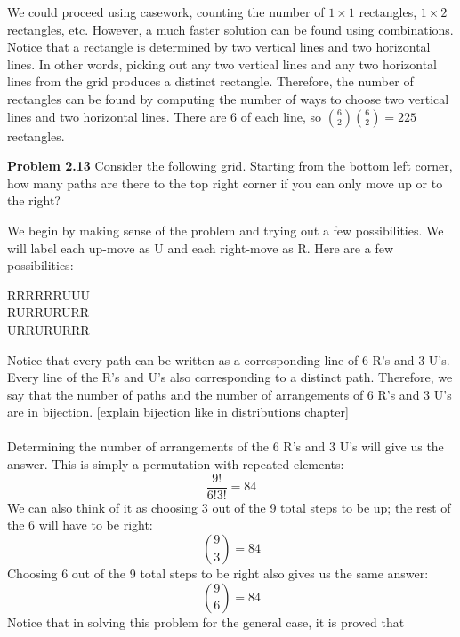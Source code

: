 \documentclass[11pt]{scrartcl}
\begin{document}
\noindent 
We could proceed using casework, counting the number of $1 \times 1$ rectangles, $1 \times 2$ rectangles, etc. However, a much faster solution can be found using combinations. Notice that a rectangle is determined by two vertical lines and two horizontal lines. In other words, picking out any two vertical lines and any two horizontal lines from the grid produces a distinct rectangle. Therefore, the number of rectangles can be found by computing the number of ways to choose two vertical lines and two horizontal lines. There are 6 of each line, so ${{6 \choose 2}}{{6 \choose 2}}=225$ rectangles. 
\begin{tcolorbox}
\textbf{Problem 2.13} Consider the following grid. Starting from the bottom left corner, how many paths are there to the top right corner if you can only move up or to the right?
\vspace*{+0.25cm}

\centering 
{}
\end{tcolorbox}
\noindent 
We begin by making sense of the problem and trying out a few possibilities. We will label each up-move as U and each right-move as R. Here are a few possibilities: 
\begin{center}
    RRRRRRUUU\\
    RURRURURR\\
    URRURURRR
\end{center}
Notice that every path can be written as a corresponding line of 6 R's and 3 U's. Every line of the R's and U's also corresponding to a distinct path. Therefore, we say that the number of paths and the number of arrangements of 6 R's and 3 U's are in bijection. [explain bijection like in distributions chapter]\\
\\
\noindent 
Determining the number of arrangements of the 6 R's and 3 U's will give us the answer. This is simply a permutation with repeated elements: 
$$\frac{9!}{6!3!}=84$$
We can also think of it as choosing 3 out of the 9 total steps to be up; the rest of the 6 will have to be right:
$${9 \choose 3}=84$$
Choosing 6 out of the 9 total steps to be right also gives us the same answer: 
$${9 \choose 6}=84$$
Notice that in solving this problem for the general case, it is proved that 
\end{document}
